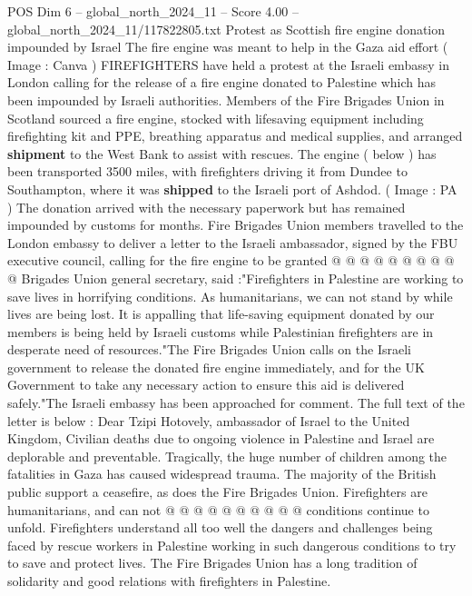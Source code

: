 \begin{textsample}{POS Dim 6 – global\_north\_2024\_11 – Score 4.00 – global\_north\_2024\_11/117822805.txt}  \label{ex:f6_pos_354}
Protest as Scottish fire engine donation impounded by Israel The fire engine was meant to help in the Gaza aid effort ( Image : Canva ) FIREFIGHTERS have held a protest at the Israeli embassy in London calling for the release of a fire engine donated to Palestine which has been impounded by Israeli authorities.
Members of the Fire Brigades Union in Scotland sourced a fire engine, stocked with lifesaving equipment including firefighting kit and PPE, breathing apparatus and medical supplies, and arranged \textbf{shipment} to the West Bank to assist with rescues.
The engine ( below ) has been transported 3500 miles, with firefighters driving it from Dundee to Southampton, where it was \textbf{shipped} to the Israeli port of Ashdod. ( Image : PA ) The donation arrived with the necessary paperwork but has remained impounded by customs for months.
Fire Brigades Union members travelled to the London embassy to deliver a letter to the Israeli ambassador, signed by the FBU executive council, calling for the fire engine to be granted @ @ @ @ @ @ @ @ @ @ Brigades Union general secretary, said :"Firefighters in Palestine are working to save lives in horrifying conditions.
As humanitarians, we can not stand by while lives are being lost.
It is appalling that life-saving equipment donated by our members is being held by Israeli customs while Palestinian firefighters are in desperate need of resources."The Fire Brigades Union calls on the Israeli government to release the donated fire engine immediately, and for the UK Government to take any necessary action to ensure this aid is delivered safely."The Israeli embassy has been approached for comment.
The full text of the letter is below : Dear Tzipi Hotovely, ambassador of Israel to the United Kingdom, Civilian deaths due to ongoing violence in Palestine and Israel are deplorable and preventable.
Tragically, the huge number of children among the fatalities in Gaza has caused widespread trauma.
The majority of the British public support a ceasefire, as does the Fire Brigades Union.
Firefighters are humanitarians, and can not @ @ @ @ @ @ @ @ @ @ conditions continue to unfold.
Firefighters understand all too well the dangers and challenges being faced by rescue workers in Palestine working in such dangerous conditions to try to save and protect lives.
The Fire Brigades Union has a long tradition of solidarity and good relations with firefighters in Palestine.

\end{textsample}
